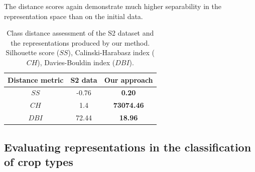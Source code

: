 \documentclass[journal,article,submit,pdftex,moreauthors]{Definitions/mdpi}
\begin{document}
The distance scores again demonstrate much higher separability in the representation space than on the initial data.
\begin{table}[H]
	\centering
	\caption{Class distance assessment of the S2 dataset and the representations produced by our method. Silhouette score ($SS$), Calinski-Harabasz index ($CH$), Davies-Bouldin index ($DBI$).}
	\begin{tabular}{c|c|c}
		\hline
		Distance metric & S2 data & Our approach \\
		\hline  	
		$SS$ & -0.76 & \textbf{0.20} \\
        $CH$ & 1.4 & \textbf{73074.46} \\
		$DBI$ & 72.44  & \textbf{18.96} \\ 
		\hline
	\end{tabular}
	\label{distance_metrics_results}
\end{table}

\subsection{Evaluating representations in the classification of crop types}\label{results_section}

\end{document}
